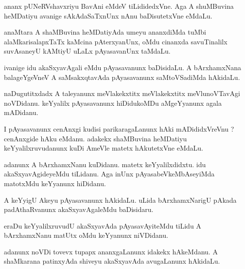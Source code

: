 \documentclass{article}
\begin{document}
\begin{mn}
ananx  pUNeRVshavxriyu  BavAni  eMdeV  tiLididedxVne.  Aga  A  shuMBuvina  heMDatiyu  avanige  sAkAdaSaTxnUnx  nAnu  baDisutetxVne  eMdaLu.
\end{mn}

\begin{mn}
anaMtara  A  shaMBuvina  heMDatiyAda  umeyu  ananxdiMda  tuMbi  alaMkarisalapxTaTx  kaMcina  pAterxyanUnx,  oMdu  cinanxda  savuTinalilx  
suvAsaneyU  kAMtiyU  uLaLx  pAyasavanUnx  taMdaLu.
\end{mn}

\begin{mn}
ivanige  idu  akaSxyavAgali  eMdu  pAyasavanunx  baDisidaLu.  A  bArxhamxNana  balageYgeVneV  A  saMsakxqtavAda  pAyasavanunx  
saMtoVSadiMda  hAkidaLu.
\end{mn}

\begin{mn}
naDugutitxdadx  A  taleyanunx  meVlakekxtitx  meVlakekxtitx  meVlunoVTavAgi  noVDidanu.  keYyalilx  pAyasavanunx  hiDidukoMDu  
aMgeYyanunx  agala  mADidanu.
\end{mn}

\begin{mn}
I  pAyasavanunx  cenAnxgi  kudisi  parikaragaLanunx  hAki  mADididxVreVnu ?  cenAnxgide  hAku  eMdanu.  adakekx  shaMBuvina  
heMDatiyu  keYyalilxruvudanunx  kuDi  AmeVle  matetx  hAkutetxVne  eMdaLu.
\end{mn}

\begin{mn}
adanunx  A  bArxhamxNanu  kuDidanu.  matetx  keYyalilxdidxtu.  idu  akaSxyavAgideyeMdu  tiLidanu.  Aga  inUnx  
pAyasabeVkeMbAseyiMda  matotxMdu  keYyanunx  hiDidanu.
\end{mn}

\begin{mn}
A  keYyigU  Akeyu  pAyasavanunx  hAkidaLu.  uLida  bArxhamxNarigU  pAkada  padAthaRvanunx  akaSxyavAgaleMdu  baDisidaru.
\end{mn}

\begin{mn}
eraDu  keYyalilxruvudU  akaSxyavAda  pAyasavAyiteMdu  tiLidu  A  bArxhamxNanu  matUtx  oMdu  keYyanunx  niVDidanu.
\end{mn}

\begin{mn}
adanunx  noVDi  tovevx  tupapx  ananxgaLanunx  idakekx  hAkeMdanu.  A  shaMkarana  patinxyAda  shiveyu  akaSxyavAda  
avugaLanunx  hAkidaLu.
\end{mn}
\end{document}

